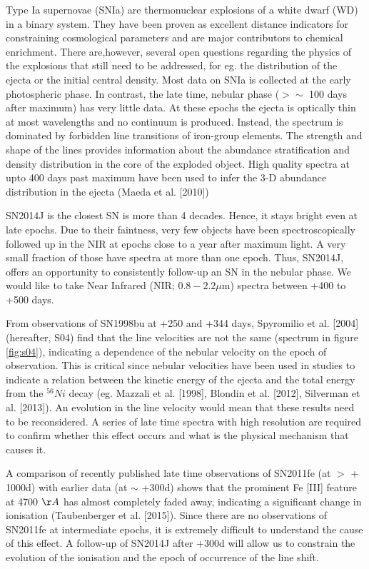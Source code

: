 \documentclass[11pt]{article}
\begin{document}
\sciencejustification    %
Type Ia supernovae (SNIa) are thermonuclear explosions of a white dwarf (WD) in a binary system. They have been proven as excellent distance indicators for constraining cosmological parameters and are major contributors to chemical enrichment. There are,however, several open questions regarding the physics of the explosions that still need to be addressed, for eg. the distribution of the ejecta or the initial central density. 
Most data on SNIa is collected at the early photospheric phase. In contrast, the late time, nebular phase ($> \sim$ 100 days after maximum) has very little data. At these epochs the ejecta is optically thin at most wavelengths and no continuum is produced. Instead, the spectrum is dominated by forbidden line transitions of iron-group elements. The strength and shape of the lines provides information about the abundance stratification and density distribution in the core of the exploded object. High quality spectra at upto 400 days past maximum have been used to infer the 3-D abundance distribution in the ejecta (Maeda et al. [2010])

SN2014J is the closest SN is more than 4 decades. Hence, it stays bright even at late epochs. Due to their faintness, very few objects have been spectroscopically followed up in the NIR at epochs close to a year after maximum light. A very small fraction of those have spectra at more than one epoch. Thus, SN2014J, offers an opportunity to consistently follow-up an SN in the nebular phase. We would like to take Near Infrared (NIR; $0.8 - 2.2 \mu$m) spectra between +400 to +500 days. 

From observations of  SN1998bu at +250 and +344 days, Spyromilio et al. [2004] (hereafter, S04) find that the line velocities are not the same (spectrum in figure \ref{fig:s04}), indicating a dependence of the nebular velocity on the epoch of observation. This is critical since nebular velocities have been used in studies to indicate a relation between the kinetic energy of the ejecta and the total energy from the $^{56} Ni$ decay (eg. Mazzali et al. [1998], Blondin et al. [2012], Silverman et al. [2013]). An evolution in the line velocity would mean that these results need to be reconsidered. A series of late time spectra with high resolution are required to confirm whether this effect occurs and what is the physical mechanism that causes it. 

A comparison of recently published late time observations of SN2011fe (at $>$ + 1000d) with earlier data (at $\sim$ +300d) shows that the prominent Fe [III] feature at 4700 $\AA$ has almost completely faded away, indicating a significant change in ionisation (Taubenberger et al. [2015]). Since there are no observations of SN2011fe at intermediate epochs, it is extremely difficult to understand the cause of this effect. A follow-up of SN2014J after +300d will allow us to constrain the evolution of the ionisation and the epoch of occurrence of the line shift.
\end{document}
